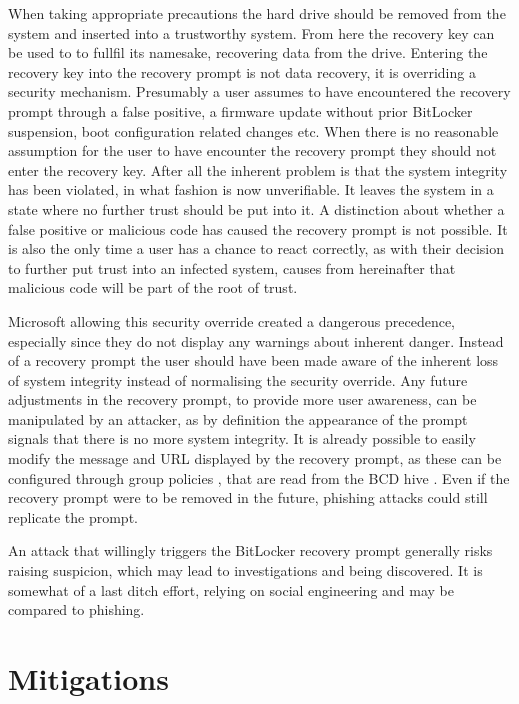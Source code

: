 When taking appropriate precautions the hard drive should be removed from the system and inserted into a trustworthy system.
From here the recovery key can be used to to fullfil its namesake, recovering data from the drive.
Entering the recovery key into the recovery prompt is not data recovery, it is overriding a security mechanism.
Presumably a user assumes to have encountered the recovery prompt through a false positive, a firmware update without prior BitLocker suspension, boot configuration related changes etc.
When there is no reasonable assumption for the user to have encounter the recovery prompt they should not enter the recovery key.
After all the inherent problem is that the system integrity has been violated, in what fashion is now unverifiable.
It leaves the system in a state where no further trust should be put into it.
A distinction about whether a false positive or malicious code has caused the recovery prompt is not possible.
It is also the only time a user has a chance to react correctly, as with their decision to further put trust into an infected system, causes from hereinafter that malicious code will be part of the root of trust.

Microsoft allowing this security override created a dangerous precedence, especially since they do not display any warnings about inherent danger.
Instead of a recovery prompt the user should have been made aware of the inherent loss of system integrity instead of normalising the security override.
Any future adjustments in the recovery prompt, to provide more user awareness, can be manipulated by an attacker, as by definition the appearance of the prompt signals that there is no more system integrity.
It is already possible to  easily modify the message and \ac{URL} displayed by the recovery prompt, as these can be configured through group policies \cite{microsoft-windows-bitlocker-group-policy-settings-url}, that are read from the \ac{BCD} hive \cite{microsoft-windows-bcd-settings-and-bitlocker}.
Even if the recovery prompt were to be removed in the future, phishing attacks could still replicate the prompt.

An attack that willingly triggers the BitLocker recovery prompt generally risks raising suspicion, which may lead to investigations and being discovered.
It is somewhat of a last ditch effort, relying on social engineering and may be compared to phishing.

\section{Mitigations}

